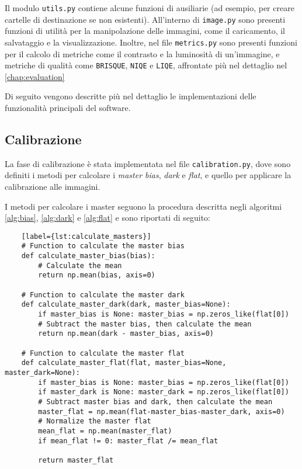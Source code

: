 Il modulo \texttt{utils.py} contiene alcune funzioni di ausiliarie (ad esempio, per creare cartelle di destinazione se non esistenti). All'interno di \texttt{image.py} sono presenti funzioni di utilità per la manipolazione delle immagini, come il caricamento, il salvataggio e la visualizzazione. Inoltre, nel file \texttt{metrics.py} sono presenti funzioni per il calcolo di metriche come il contrasto e la luminosità di un'immagine, e metriche di qualità come \texttt{BRISQUE}, \texttt{NIQE} e \texttt{LIQE}, affrontate più nel dettaglio nel \cref{chap:evaluation}

Di seguito vengono descritte più nel dettaglio le implementazioni delle funzionalità principali del software.

\subsection{Calibrazione} \label{subsec:calibration_impl}

La fase di calibrazione è stata implementata nel file \texttt{calibration.py}, dove sono definiti i metodi per calcolare i \textit{master bias}, \textit{dark} e \textit{flat}, e quello per applicare la calibrazione alle immagini.

I metodi per calcolare i master seguono la procedura descritta negli algoritmi \ref{alg:bias}, \ref{alg:dark} e \ref{alg:flat} e sono riportati di seguito:

\begin{lstlisting}
    [label={lst:calculate_masters}]
    # Function to calculate the master bias
    def calculate_master_bias(bias):
        # Calculate the mean
        return np.mean(bias, axis=0)

    # Function to calculate the master dark
    def calculate_master_dark(dark, master_bias=None):
        if master_bias is None: master_bias = np.zeros_like(flat[0])
        # Subtract the master bias, then calculate the mean
        return np.mean(dark - master_bias, axis=0)

    # Function to calculate the master flat
    def calculate_master_flat(flat, master_bias=None, master_dark=None):
        if master_bias is None: master_bias = np.zeros_like(flat[0])
        if master_dark is None: master_dark = np.zeros_like(flat[0])
        # Subtract master bias and dark, then calculate the mean
        master_flat = np.mean(flat-master_bias-master_dark, axis=0)   
        # Normalize the master flat
        mean_flat = np.mean(master_flat)
        if mean_flat != 0: master_flat /= mean_flat
        
        return master_flat
\end{lstlisting}


